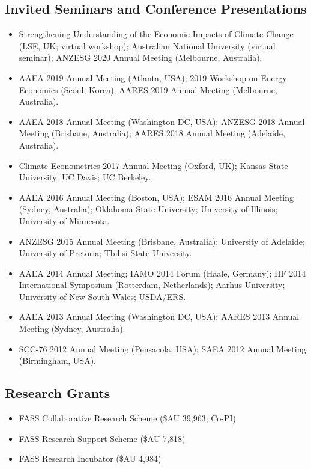 \documentclass[10pt]{article}
\begin{document}
	\subsection*{Invited Seminars and Conference Presentations}
	\begin{itemize}
		\item {} Strengthening Understanding of the Economic Impacts of Climate Change (LSE, UK; virtual workshop); Australian National University (virtual seminar); ANZESG 2020 Annual Meeting (Melbourne, Australia).
		\item {} AAEA 2019 Annual Meeting (Atlanta, USA); 2019 Workshop on Energy Economics (Seoul, Korea); AARES 2019 Annual Meeting (Melbourne, Australia).
		\item {} AAEA 2018 Annual Meeting (Washington DC, USA); ANZESG 2018 Annual Meeting (Brisbane, Australia); AARES 2018 Annual Meeting (Adelaide, Australia).
		\item {} Climate Econometrics 2017 Annual Meeting (Oxford, UK); Kansas State University; UC Davis; UC Berkeley.
		\item {} AAEA 2016 Annual Meeting (Boston, USA); ESAM 2016 Annual Meeting (Sydney, Australia); Oklahoma State University; University of Illinois; University of Minnesota.
		\item {} ANZESG 2015 Annual Meeting (Brisbane, Australia); University of Adelaide; University of Pretoria; Tbilisi State University.
		\item {} AAEA 2014 Annual Meeting; IAMO 2014 Forum (Haale, Germany); IIF 2014 International Symposium (Rotterdam, Netherlands); Aarhus University; University of New South Wales; USDA/ERS.
		\item {} AAEA 2013 Annual Meeting (Washington DC, USA); AARES 2013 Annual Meeting (Sydney, Australia).
		\item {} SCC-76 2012 Annual Meeting (Pensacola, USA); SAEA 2012 Annual Meeting (Birmingham, USA).
	\end{itemize}
	
	\subsection*{Research Grants}
	\begin{itemize}
		\item {} FASS Collaborative Research Scheme (\$AU 39,963; Co-PI)
		\item {} FASS Research Support Scheme (\$AU 7,818)
		\item {} FASS Research Incubator (\$AU 4,984)
	\end{itemize}
	
\end{document}
